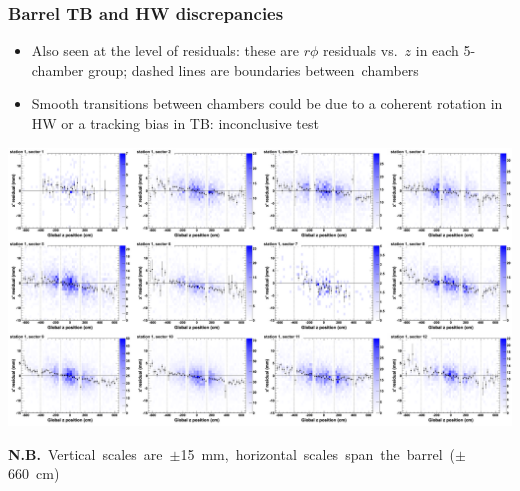 \documentclass[compress]{beamer}
\begin{document}
\begin{frame}
\begin{columns}
\vfill

\end{columns}
\end{frame}

\begin{frame}
\frametitle{Barrel TB and HW discrepancies}
\begin{itemize}
\item Also seen at the level of residuals: these are $r\phi$ residuals
vs.\ $z$ in each 5-chamber group; dashed lines are boundaries \mbox{between chambers\hspace{-1 cm}}
\item Smooth transitions between chambers could be due to a coherent rotation in HW or a tracking bias in TB: inconclusive test
\end{itemize}
\begin{center}
\includegraphics[width=0.9\linewidth]{twist2.png}
\end{center}

\vspace{-0.5 cm}
\mbox{\scriptsize {\bf N.B.} Vertical scales are $\pm$15~mm, horizontal scales span the barrel ($\pm$660~cm) \hspace{-1 cm}}
\end{frame}
\end{document}
